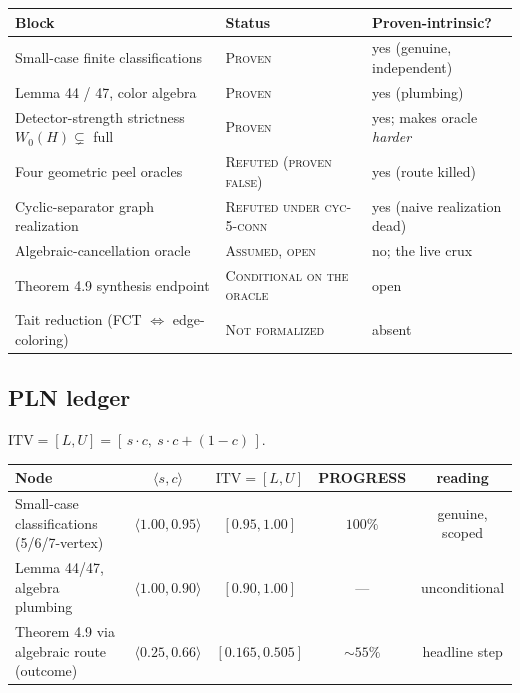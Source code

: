 \begin{center}
\begin{tabular}{lll}
\hline
Block & Status & Proven-intrinsic? \\
\hline
Small-case finite classifications & \textsc{Proven} & yes (genuine, independent) \\
Lemma 44 / 47, color algebra & \textsc{Proven} & yes (plumbing) \\
Detector-strength strictness $W_0(H)\subsetneq$ full & \textsc{Proven} & yes; makes oracle \emph{harder} \\
Four geometric peel oracles & \textsc{Refuted (proven false)} & yes (route killed) \\
Cyclic-separator graph realization & \textsc{Refuted under cyc-5-conn} & yes (naive realization dead) \\
Algebraic-cancellation oracle & \textsc{Assumed, open} & no; the live crux \\
Theorem 4.9 synthesis endpoint & \textsc{Conditional on the oracle} & open \\
Tait reduction (FCT $\Leftrightarrow$ edge-coloring) & \textsc{Not formalized} & absent \\
\hline
\end{tabular}
\end{center}

\subsection{PLN ledger}
\label{sec:fc-pln}

$\mathrm{ITV}=[L,U]=[\,s\cdot c,\ s\cdot c+(1-c)\,]$.

\begin{center}
\begin{tabular}{lcccc}
\hline
Node & $\langle s,c\rangle$ & $\mathrm{ITV}=[L,U]$ & PROGRESS & reading \\
\hline
Small-case classifications (5/6/7-vertex) & $\langle 1.00,0.95\rangle$ & $[0.95,1.00]$ & $100\%$ & genuine, scoped \\
Lemma 44/47, algebra plumbing & $\langle 1.00,0.90\rangle$ & $[0.90,1.00]$ & --- & unconditional \\
Theorem 4.9 via algebraic route (outcome) & $\langle 0.25,0.66\rangle$ & $[0.165,0.505]$ & $\sim 55\%$ & headline step \\
\hline
\end{tabular}
\end{center}


